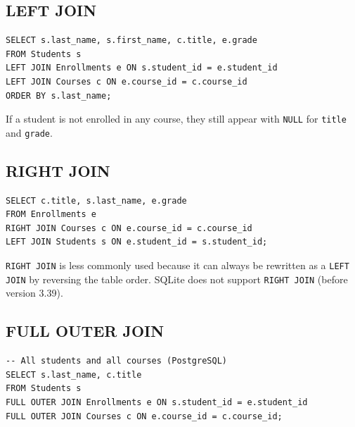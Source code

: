 \subsection{LEFT JOIN}

\begin{codeblock}[title=\textbf{LEFT JOIN --- All Students, Even Without Enrollments}]
\begin{verbatim}
SELECT s.last_name, s.first_name, c.title, e.grade
FROM Students s
LEFT JOIN Enrollments e ON s.student_id = e.student_id
LEFT JOIN Courses c ON e.course_id = c.course_id
ORDER BY s.last_name;
\end{verbatim}
\end{codeblock}

If a student is not enrolled in any course, they still appear with
\texttt{NULL} for \texttt{title} and \texttt{grade}.

\subsection{RIGHT JOIN}

\begin{codeblock}[title=\textbf{RIGHT JOIN --- All Courses, Even Without Enrollments}]
\begin{verbatim}
SELECT c.title, s.last_name, e.grade
FROM Enrollments e
RIGHT JOIN Courses c ON e.course_id = c.course_id
LEFT JOIN Students s ON e.student_id = s.student_id;
\end{verbatim}
\end{codeblock}

\begin{remark}
\texttt{RIGHT JOIN} is less commonly used because it can always be rewritten
as a \texttt{LEFT JOIN} by reversing the table order.
SQLite does not support \texttt{RIGHT JOIN} (before version 3.39).
\end{remark}

\subsection{FULL OUTER JOIN}

\begin{codeblock}[title=\textbf{FULL OUTER JOIN}]
\begin{verbatim}
-- All students and all courses (PostgreSQL)
SELECT s.last_name, c.title
FROM Students s
FULL OUTER JOIN Enrollments e ON s.student_id = e.student_id
FULL OUTER JOIN Courses c ON e.course_id = c.course_id;
\end{verbatim}
\end{codeblock}

